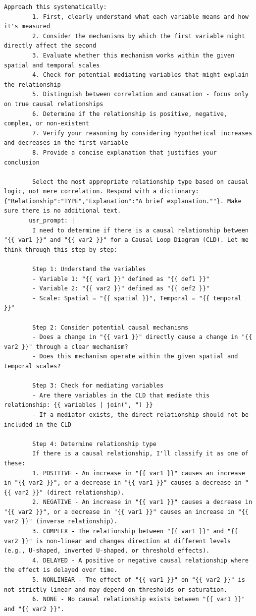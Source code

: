 \begin{lstlisting}[caption={Generator Prompt Configuration: Nitai\_C (\texttt{generateNodes} + \texttt{generateEdges})},label={lst:generator_nitai_c_yaml}]
        Approach this systematically:
        1. First, clearly understand what each variable means and how it's measured
        2. Consider the mechanisms by which the first variable might directly affect the second
        3. Evaluate whether this mechanism works within the given spatial and temporal scales
        4. Check for potential mediating variables that might explain the relationship
        5. Distinguish between correlation and causation - focus only on true causal relationships
        6. Determine if the relationship is positive, negative, complex, or non-existent
        7. Verify your reasoning by considering hypothetical increases and decreases in the first variable
        8. Provide a concise explanation that justifies your conclusion
        
        Select the most appropriate relationship type based on causal logic, not mere correlation. Respond with a dictionary: {"Relationship":"TYPE","Explanation":"A brief explanation.""}. Make sure there is no additional text.
       usr_prompt: | 
        I need to determine if there is a causal relationship between "{{ var1 }}" and "{{ var2 }}" for a Causal Loop Diagram (CLD). Let me think through this step by step:
        
        Step 1: Understand the variables
        - Variable 1: "{{ var1 }}" defined as "{{ def1 }}"
        - Variable 2: "{{ var2 }}" defined as "{{ def2 }}"
        - Scale: Spatial = "{{ spatial }}", Temporal = "{{ temporal }}"
        
        Step 2: Consider potential causal mechanisms
        - Does a change in "{{ var1 }}" directly cause a change in "{{ var2 }}" through a clear mechanism?
        - Does this mechanism operate within the given spatial and temporal scales?
        
        Step 3: Check for mediating variables
        - Are there variables in the CLD that mediate this relationship: {{ variables | join(", ") }}
        - If a mediator exists, the direct relationship should not be included in the CLD
        
        Step 4: Determine relationship type
        If there is a causal relationship, I'll classify it as one of these:
        1. POSITIVE - An increase in "{{ var1 }}" causes an increase in "{{ var2 }}", or a decrease in "{{ var1 }}" causes a decrease in "{{ var2 }}" (direct relationship).
        2. NEGATIVE - An increase in "{{ var1 }}" causes a decrease in "{{ var2 }}", or a decrease in "{{ var1 }}" causes an increase in "{{ var2 }}" (inverse relationship).
        3. COMPLEX - The relationship between "{{ var1 }}" and "{{ var2 }}" is non-linear and changes direction at different levels (e.g., U-shaped, inverted U-shaped, or threshold effects).
        4. DELAYED - A positive or negative causal relationship where the effect is delayed over time.
        5. NONLINEAR - The effect of "{{ var1 }}" on "{{ var2 }}" is not strictly linear and may depend on thresholds or saturation.
        6. NONE - No causal relationship exists between "{{ var1 }}" and "{{ var2 }}".


\end{lstlisting}
